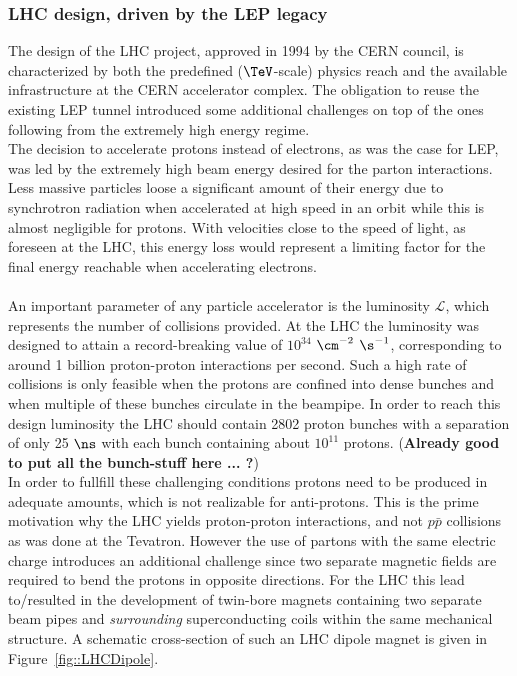 \subsubsection{LHC design, driven by the LEP legacy}
The design of the LHC project, approved in 1994 by the CERN council, is characterized by both the predefined ($\TeV$-scale) physics reach and the available infrastructure at the CERN accelerator complex.
The obligation to reuse the existing LEP tunnel introduced some additional challenges on top of the ones following from the extremely high energy regime. 
\\
The decision to accelerate protons instead of electrons, as was the case for LEP, was led by the extremely high beam energy desired for the parton interactions. Less massive particles loose a significant amount of their energy due to synchrotron radiation when accelerated at high speed in an orbit while this is almost negligible for protons. With velocities close to the speed of light, as foreseen at the LHC, this energy loss would represent a limiting factor for the final energy reachable when accelerating electrons.
\\
\\
An important parameter of any particle accelerator is the luminosity $\mathcal{L}$, which represents the number of collisions provided.
At the LHC the luminosity was designed to attain a record-breaking value of $10^{34}$ $\cm^{-2}$ $\s^{-1}$, corresponding to around 1 billion proton-proton interactions per second. Such a high rate of collisions is only feasible when the protons are confined into dense bunches and when multiple of these bunches circulate in the beampipe.
In order to reach this design luminosity the LHC should contain 2802 proton bunches with a separation of only 25 $\ns$ with each bunch containing about $10^{11}$ protons. (\textbf{Already good to put all the bunch-stuff here ... ?})
\\
In order to fullfill these challenging conditions protons need to be produced in adequate amounts, which is not realizable for anti-protons. This is the prime motivation why the LHC yields proton-proton interactions, and not $p\bar{p}$ collisions as was done at the Tevatron.
However the use of partons with the same electric charge introduces an additional challenge since two separate magnetic fields are required to bend the protons in opposite directions. For the LHC this lead to/resulted in the development of twin-bore magnets containing two separate beam pipes and \textit{surrounding} superconducting coils within the same mechanical structure. A schematic cross-section of such an LHC dipole magnet is given in Figure~\ref{fig::LHCDipole}.
